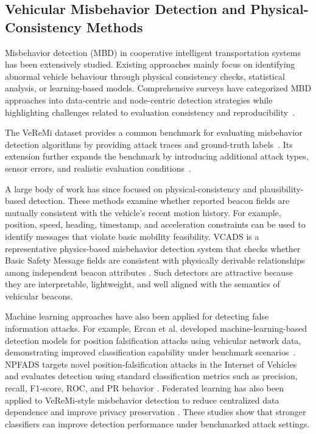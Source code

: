 \documentclass[journal]{IEEEtran}
\begin{document}
\subsection{Vehicular Misbehavior Detection and Physical-Consistency Methods}
\label{subsec:rw_misbehavior_detection}

Misbehavior detection (MBD) in cooperative intelligent transportation
systems has been extensively studied. Existing approaches mainly focus
on identifying abnormal vehicle behaviour through physical consistency
checks, statistical analysis, or learning-based models. Comprehensive
surveys have categorized MBD approaches into data-centric and
node-centric detection strategies while highlighting challenges related
to evaluation consistency and reproducibility~\cite{vdh_survey}.

The VeReMi dataset provides a common benchmark for evaluating
misbehavior detection algorithms by providing attack traces and
ground-truth labels~\cite{veremi}. Its extension further expands the
benchmark by introducing additional attack types, sensor errors, and
realistic evaluation conditions~\cite{veremi_ext}.

A large body of work has since focused on physical-consistency and plausibility-based detection. These methods examine whether reported beacon fields are mutually consistent with the vehicle's recent motion history. For example, position, speed, heading, timestamp, and acceleration constraints can be used to identify messages that violate basic mobility feasibility. VCADS is a representative physics-based misbehavior detection system that checks whether Basic Safety Message fields are consistent with physically derivable relationships among independent beacon attributes \cite{andradeSalazar2022VCADS}. Such detectors are attractive because they are interpretable, lightweight, and well aligned with the semantics of vehicular beacons.

Machine learning approaches have also been applied for detecting
false information attacks. For example, Ercan et al. developed
machine-learning-based detection models for position falsification
attacks using vehicular network data, demonstrating improved
classification capability under benchmark scenarios~\cite{ercan_ml}.
NPFADS targets novel position-falsification attacks in the Internet of
Vehicles and evaluates detection using standard classification metrics such
as precision, recall, F1-score, ROC, and PR behavior
\cite{ilango2022NPFADS}. Federated learning has also been applied to
VeReMi-style misbehavior detection to reduce centralized data dependence and
improve privacy preservation \cite{campos2024FLMisbehavior}. These studies
show that stronger classifiers can improve detection performance under
benchmarked attack settings.
\end{document}
